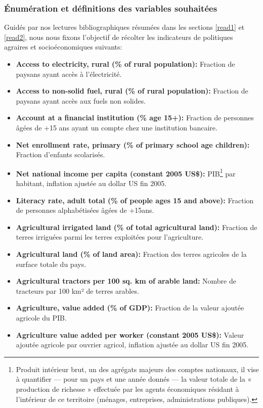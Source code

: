 	\subsubsection{Énumération et définitions des variables souhaitées }
			Guidés par nos lectures bibliographiques résumées dans les sections \ref{read1} et \ref{read2}, nous nous fixons l'objectif de récolter les indicateurs de politiques agraires et socioéconomiques suivants:
	\begin{itemize}
		\item \textbf{ Access to electricity, rural (\% of rural population):} Fraction de paysans ayant accès à l'électricité.
		\item \textbf{ Access to non-solid fuel, rural (\% of rural population):} Fraction de paysans ayant accès aux fuels non solides.
		\item \textbf{ Account at a financial institution (\% age 15+):} Fraction de personnes âgées de +15 ans ayant un compte chez une institution bancaire.
		\item \textbf{ Net enrollment rate, primary (\% of primary school age children):} Fraction d'enfants scolarisés.
		\item \textbf{ Net national income per capita (constant 2005 US\$):} PIB\footnote{Produit intérieur brut, un des agrégats majeurs des comptes nationaux, il vise à quantifier — pour un pays et une année donnés — la valeur totale de la « production de richesse » effectuée par les agents économiques résidant à l’intérieur de ce territoire (ménages, entreprises, administrations publiques).} par habitant, inflation ajustée au dollar US fin 2005.
		\item \textbf{ Literacy rate, adult total (\% of people ages 15 and above):} Fraction de personnes alphabétisées âgées de +15ans.
		\item \textbf{ Agricultural irrigated land (\% of total agricultural land):} Fraction de terres irriguées parmi les terres exploitées pour l'agriculture.
		\item \textbf{ Agricultural land (\% of land area):} Fraction des terres agricoles de la surface totale du pays.
		\item \textbf{ Agricultural tractors per 100 sq. km of arable land:} Nombre de tracteurs par 100 km² de terres arables.
		\item \textbf{ Agriculture, value added (\% of GDP):} Fraction de la valeur ajoutée agricole du PIB.
		\item \textbf{ Agriculture value added per worker (constant 2005 US\$):} Valeur ajoutée agricole par ouvrier agricol, inflation ajustée au dollar US fin 2005.

\end{itemize}
